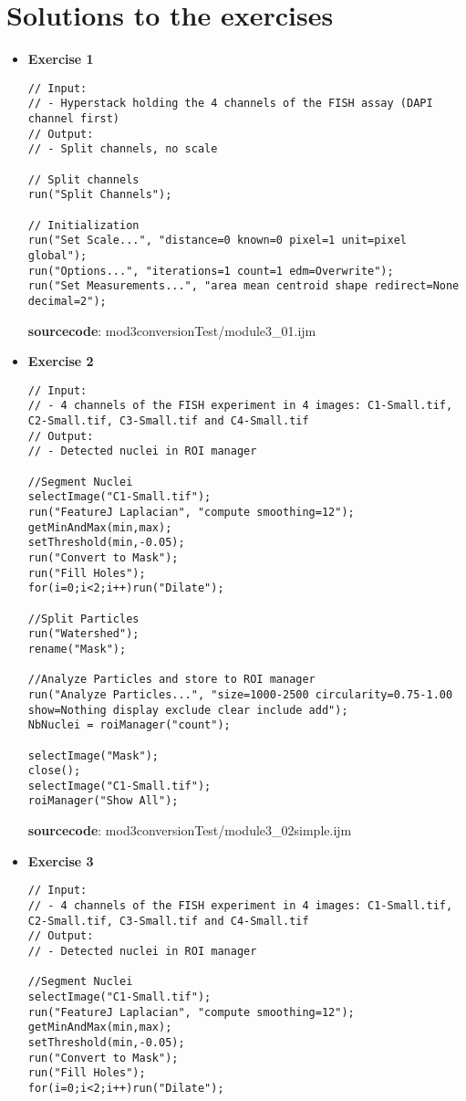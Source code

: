 \section{Solutions to the exercises}

\begin{itemize}
\item \textbf{Exercise 1}

\begin{lstlisting}
// Input: 
// - Hyperstack holding the 4 channels of the FISH assay (DAPI channel first)
// Output: 
// - Split channels, no scale

// Split channels
run("Split Channels");

// Initialization
run("Set Scale...", "distance=0 known=0 pixel=1 unit=pixel global");
run("Options...", "iterations=1 count=1 edm=Overwrite");
run("Set Measurements...", "area mean centroid shape redirect=None decimal=2");
\end{lstlisting}
\textbf{sourcecode}: mod3conversionTest/module3_01.ijm
\item \textbf{Exercise 2}

\begin{lstlisting}
// Input: 
// - 4 channels of the FISH experiment in 4 images: C1-Small.tif, C2-Small.tif, C3-Small.tif and C4-Small.tif
// Output: 
// - Detected nuclei in ROI manager

//Segment Nuclei
selectImage("C1-Small.tif");
run("FeatureJ Laplacian", "compute smoothing=12");
getMinAndMax(min,max);
setThreshold(min,-0.05);
run("Convert to Mask");
run("Fill Holes");
for(i=0;i<2;i++)run("Dilate");

//Split Particles
run("Watershed");
rename("Mask");

//Analyze Particles and store to ROI manager
run("Analyze Particles...", "size=1000-2500 circularity=0.75-1.00 show=Nothing display exclude clear include add");
NbNuclei = roiManager("count");

selectImage("Mask");
close();
selectImage("C1-Small.tif");
roiManager("Show All");
\end{lstlisting}
\textbf{sourcecode}: mod3conversionTest/module3_02simple.ijm
\item \textbf{Exercise 3}

\begin{lstlisting}
// Input: 
// - 4 channels of the FISH experiment in 4 images: C1-Small.tif, C2-Small.tif, C3-Small.tif and C4-Small.tif
// Output: 
// - Detected nuclei in ROI manager

//Segment Nuclei
selectImage("C1-Small.tif");
run("FeatureJ Laplacian", "compute smoothing=12");
getMinAndMax(min,max);
setThreshold(min,-0.05);
run("Convert to Mask");
run("Fill Holes");
for(i=0;i<2;i++)run("Dilate");


\end{lstlisting}
\end{itemize}
